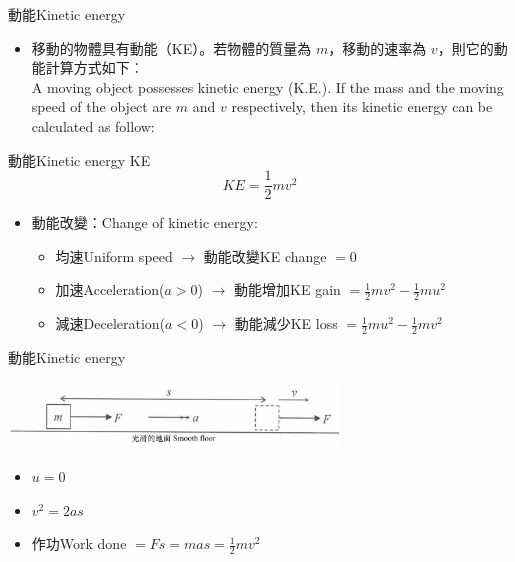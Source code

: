 \documentclass[beamer=true]{standalone}
\begin{document}
\begin{frame}{動能Kinetic energy}
    \begin{itemize}
        \item 移動的物體具有動能（KE）。若物體的質量為 $m$，移動的速率為 $v$，則它的動能計算方式如下︰\\ A moving object possesses kinetic energy (K.E.). If the mass and the moving speed of the object are $m$ and $v$ respectively, then its kinetic energy can be calculated as follow:
    \end{itemize}
    \begin{alertblock}
        {動能Kinetic energy KE}
        \begin{equation}
            KE=\frac{1}{2}mv^2
        \end{equation}
    \end{alertblock}
    \begin{itemize}
        \item 動能改變：Change of kinetic energy:
              \begin{itemize}
                  \item 均速Uniform speed $\rightarrow$ 動能改變KE change  $=0$
                  \item 加速Acceleration($a>0$) $\rightarrow$ 動能增加KE gain $=\frac{1}{2}mv^2-\frac{1}{2}mu^2$
                  \item 減速Deceleration($a<0$) $\rightarrow$ 動能減少KE loss $=\frac{1}{2}mu^2-\frac{1}{2}mv^2$
              \end{itemize}
    \end{itemize}
\end{frame}


\begin{frame}{動能Kinetic energy}
    \par
    {\par\centering
        \includegraphics[width=0.66\textwidth]{assets/7304acb1.png}
        \par}
    \begin{itemize}
        \item[] $u=0$
        \item[] $v^2=2as$
        \item[] 作功Work done $=Fs=mas=\frac{1}{2}mv^2$
    \end{itemize}
\end{frame}
\end{document}
